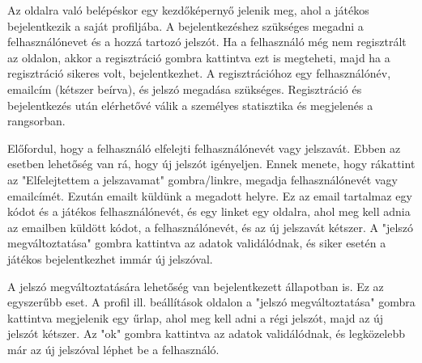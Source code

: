 











Az oldalra való belépéskor egy kezdőképernyő jelenik meg, ahol a játékos bejelentkezik a saját profiljába. A bejelentkezéshez szükséges megadni a felhasználónevet és a hozzá tartozó jelszót. Ha a felhasználó még nem regisztrált az oldalon, akkor a regisztráció gombra kattintva ezt is megteheti, majd ha a regisztráció sikeres volt, bejelentkezhet. A regisztrációhoz egy felhasználónév, emailcím (kétszer beírva), és jelszó megadása szükséges. Regisztráció és bejelentkezés után elérhetővé válik a személyes statisztika és megjelenés a rangsorban.

Előfordul, hogy a felhasználó elfelejti felhasználónevét vagy jelszavát. Ebben az esetben lehetőség van rá, hogy új jelszót igényeljen. Ennek menete, hogy rákattint az "Elfelejtettem a jelszavamat" gombra/linkre, megadja felhasználónevét vagy emailcímét. Ezután emailt küldünk a megadott helyre. Ez az email tartalmaz egy kódot és a játékos felhasználónevét, és egy linket egy oldalra, ahol meg kell adnia az emailben küldött kódot, a felhasználónevét, és az új jelszavát kétszer. A "jelszó megváltoztatása" gombra kattintva az adatok validálódnak, és siker esetén a játékos bejelentkezhet immár új jelszóval.

A jelszó megváltoztatására lehetőség van bejelentkezett állapotban is. Ez az egyszerűbb eset. A profil ill. beállítások oldalon a "jelszó megváltoztatása" gombra kattintva megjelenik egy űrlap, ahol meg kell adni a régi jelszót, majd az új jelszót kétszer. Az "ok" gombra kattintva az adatok validálódnak, és legközelebb már az új jelszóval léphet be a felhasználó.

